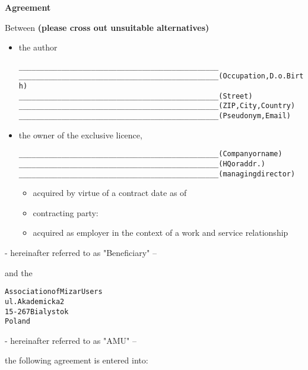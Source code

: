 

\pagebreak
\begin{center}
{\Large\bf Agreement}
\end{center}

Between 
{\bf (please cross out unsuitable alternatives)}\\
\begin{itemize}
\item the author
\begin{alltt}
    _______________________________________________
    _______________________________________________ (Occupation, D.o. Birth)
    _______________________________________________ (Street)
    _______________________________________________ (ZIP, City, Country)
    _______________________________________________ (Pseudonym, Email)
\end{alltt}
\item the owner of the exclusive licence,
\begin{alltt}
    _______________________________________________ (Company or name)
    _______________________________________________ (HQ or addr.)
    _______________________________________________ (managing director)
\end{alltt}
\begin{itemize}
\item acquired by virtue of a contract date as of
\item contracting party:
\item acquired as employer in the context of a work and service
  relationship
\end{itemize}
\end{itemize}
\begin{flushright}
- hereinafter referred to as "Beneficiary" --
\end{flushright}
and the
\begin{alltt}
Association of Mizar Users
ul. Akademicka 2
15-267 Bialystok
Poland 
\end{alltt}
\begin{flushright}
- hereinafter referred to as "AMU" --
\end{flushright}
the following agreement is entered into:\\

